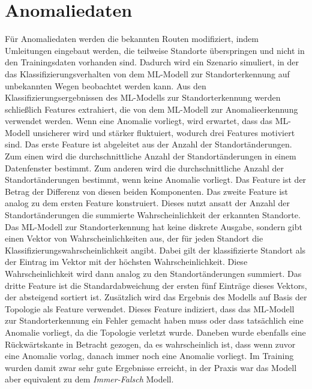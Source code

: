\section{Anomaliedaten}
\label{sec:data_anomalie}
Für Anomaliedaten werden die bekannten Routen modifiziert, indem Umleitungen eingebaut werden, die teilweise Standorte überspringen
und nicht in den Trainingsdaten vorhanden sind.
Dadurch wird ein Szenario simuliert, in der das Klassifizierungsverhalten von dem ML-Modell zur Standorterkennung auf unbekannten Wegen beobachtet werden kann.
Aus den Klassifizierungsergebnissen des ML-Modells zur Standorterkennung werden schließlich Features extrahiert,
die von dem ML-Modell zur Anomalieerkennung verwendet werden.
\newline
\newline
Wenn eine Anomalie vorliegt, wird erwartet, dass das ML-Modell unsicherer wird und stärker fluktuiert,
wodurch drei Features motiviert sind.
Das erste Feature ist abgeleitet aus der Anzahl der Standortänderungen.
Zum einen wird die durchschnittliche Anzahl der Standortänderungen in einem Datenfenster bestimmt.
Zum anderen wird die durchschnittliche Anzahl der Standortänderungen bestimmt, wenn keine Anomalie vorliegt.
Das Feature ist der Betrag der Differenz von diesen beiden Komponenten.
\newline
\newline
Das zweite Feature ist analog zu dem ersten Feature konstruiert.
Dieses nutzt ansatt der Anzahl der Standortänderungen die summierte Wahrscheinlichkeit der erkannten Standorte.
Das ML-Modell zur Standorterkennung hat keine diskrete Ausgabe, sondern gibt einen Vektor von Wahrscheinlichkeiten aus,
der für jeden Standort die Klassifizierungswahrscheinlichkeit angibt.
Dabei gilt der klassifizierte Standort als der Eintrag im Vektor mit der höchsten Wahrscheinlichkeit.
Diese Wahrscheinlichkeit wird dann analog zu den Standortänderungen summiert.
Das dritte Feature ist die Standardabweichung der ersten fünf Einträge dieses Vektors, der absteigend sortiert ist.
\newline
\newline
Zusätzlich wird das Ergebnis des Modells auf Basis der Topologie als Feature verwendet.
Dieses Feature indiziert, dass das ML-Modell zur Standorterkennung ein Fehler gemacht haben muss
oder dass tatsächlich eine Anomalie vorliegt, da die Topologie verletzt wurde.
\newline
\newline
Daneben wurde ebenfalls eine Rückwärtskante in Betracht gezogen,
da es wahrscheinlich ist, dass wenn zuvor eine Anomalie vorlag, danach immer noch eine Anomalie vorliegt.
Im Training wurden damit zwar sehr gute Ergebnisse erreicht,
in der Praxis war das Modell aber equivalent zu dem \textit{Immer-Falsch} Modell.

